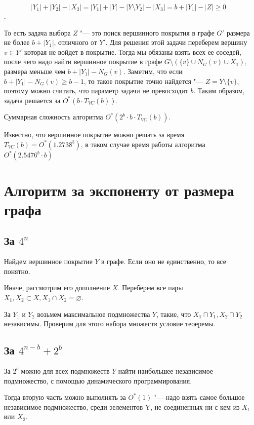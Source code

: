 \documentclass[10pt,a4paper]{article}
\begin{document}
$$|Y_1| + |Y_2| - |X_3| = |Y_1| + |Y| - |Y \setminus Y_2| - |X_3| =
b + |Y_1| - |Z| \ge 0$$.

То есть задача выбора $Z$ "--- это поиск вершинного покрытия в графе $G'$ размера не более $b + |Y_1|$,
отличного от $Y'$. Для решения этой задачи
переберем вершину $v \in Y'$ которая не войдет в покрытие.
Тогда мы обязаны взять всех ее соседей, после чего надо
найти вершинное покрытие в графе $G \setminus (\{v\} \cup N_G(v) \cup X_1)$, размера меньше чем $b + |Y_1| - N_G(v)$.
Заметим, что если $b + |Y_1| - N_G(v) \ge b - 1$, то такое покрытие точно найдется "---
$Z = Y \setminus \{v\}$, поэтому можно считать, что параметр задачи 
не превосходит $b$. 
Таким образом, задача решается за $O^*(b\cdot T_{VC}(b))$.

Суммарная сложность алгоритма $O^*(2^b\cdot b\cdot T_{VC}(b))$.

Известно, что вершинное покрытие можно решать за время $T_{VC}(b) = O^{*}(1.2738^b)$,
в таком случае время работы алгоритма $O^*(2.5476^b\cdot b)$

\section{Алгоритм за экспоненту от размера графа}

\subsection{За $4^n$}

Найдем вершинное покрытие $Y$ в графе. Если оно не единственно,
то все понятно.

Иначе, рассмотрим его дополнение $X$. Переберем
все пары $X_1, X_2 \subset X, X_1 \cap X_2 = \varnothing$.

За $Y_1$ и $Y_2$ возьмем максимальное подмножества $Y$, такие, что
$X_1 \sqcap Y_1, X_2 \sqcap Y_2$ независимы.
Проверим для этого набора множеств условие теоеремы.

\subsection{За $4^{n-b} + 2^b$}

За $2^b$ можно для всех подмножеств $Y$ найти наибольшее независимое подмножество,
с помощью динамического программирования.

Тогда вторую часть можно выполнять за $O^*(1)$ "--- надо взять самое большое независимое подмножество,
среди эелементов Y, не соединенных ни с кем из $X_1$ или $X_2$.
\end{document}

